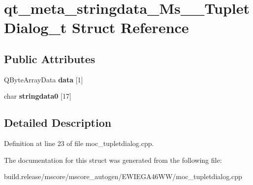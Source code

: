 \hypertarget{structqt__meta__stringdata___ms_____tuplet_dialog__t}{}\section{qt\+\_\+meta\+\_\+stringdata\+\_\+\+Ms\+\_\+\+\_\+\+Tuplet\+Dialog\+\_\+t Struct Reference}
\label{structqt__meta__stringdata___ms_____tuplet_dialog__t}
\subsection*{Public Attributes}
\begin{DoxyCompactItemize}
\item 
\mbox{\label{structqt__meta__stringdata___ms_____tuplet_dialog__t_a33ae89538018a19a607f8a0f118891fb}} 
Q\+Byte\+Array\+Data {\bfseries data} \mbox{[}1\mbox{]}
\item 
\mbox{\label{structqt__meta__stringdata___ms_____tuplet_dialog__t_a488e3efdf3478dfc9ea388a5831ed643}} 
char {\bfseries stringdata0} \mbox{[}17\mbox{]}
\end{DoxyCompactItemize}


\subsection{Detailed Description}


Definition at line 23 of file moc\+\_\+tupletdialog.\+cpp.



The documentation for this struct was generated from the following file\+:\begin{DoxyCompactItemize}
\item 
build.\+release/mscore/mscore\+\_\+autogen/\+E\+W\+I\+E\+G\+A46\+W\+W/moc\+\_\+tupletdialog.\+cpp\end{DoxyCompactItemize}
